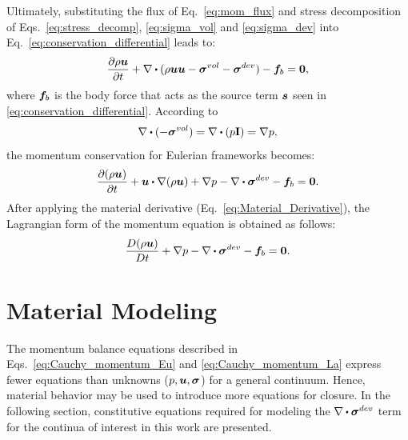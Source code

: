 Ultimately, substituting the flux of Eq.~\ref{eq:mom_flux}  and stress decomposition of Eqs.~\ref{eq:stress_decomp}, \ref{eq:sigma_vol} and \ref{eq:sigma_dev}  into Eq.~\ref{eq:conservation_differential} leads to:
\begin{align}
\frac{\partial \rho \vect{u} }{\partial t}  + \nabla \bigcdot (\rho\vect{u}\vect{u}-\bm{\sigma}^{vol}-\bm{\sigma}^{dev})-\vect{f}_b=\vect{0},
\label{eq:Cauchy_momentum}
\end{align}
where $\boldsymbol{f}_b$ is the body force that acts as the source term $\boldsymbol{s}$ seen in \ref{eq:conservation_differential}. According to  
\begin{align}
\nabla \bigcdot (-\bm{\sigma}^{vol})=\nabla \bigcdot (p\mathbf{I})=\nabla p, 
\end{align}
the momentum conservation for Eulerian frameworks becomes:
\begin{align}
\frac{\partial (\rho \vect{u}) }{\partial t}  + \vect{u} \bigcdot \nabla(\rho\vect{u}) + \nabla p- \nabla \bigcdot \bm{\sigma}^{dev} - \vect{f}_b=\vect{0}.\label{eq:Cauchy_momentum_Eu}
\end{align}
After applying the material derivative (Eq.~\ref{eq:Material_Derivative}), the Lagrangian form of the momentum equation is obtained as follows:
\begin{align}
\frac{D (\rho \vect{u}) }{D t}  + \nabla p- \nabla \bigcdot \bm{\sigma}^{dev} - \vect{f}_b=\vect{0}.\label{eq:Cauchy_momentum_La}
\end{align}

\section{Material Modeling}
The momentum balance equations described in Eqs.~\ref{eq:Cauchy_momentum_Eu} and \ref{eq:Cauchy_momentum_La} express fewer equations than unknowns ($p, \boldsymbol{u}, \bm \sigma $) for a general continuum. Hence, material behavior may be used to introduce more equations for closure. In the following section, constitutive equations required for modeling the  $\nabla \bigcdot \bm{\sigma}^{dev} $ term for the continua of interest in this work are presented.
